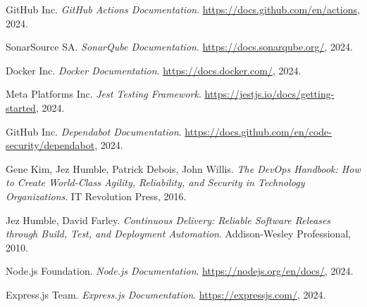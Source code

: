 


\begin{thebibliography}{9}

GitHub Inc.
\textit{GitHub Actions Documentation}.
\url{https://docs.github.com/en/actions}, 2024.

SonarSource SA.
\textit{SonarQube Documentation}.
\url{https://docs.sonarqube.org/}, 2024.

Docker Inc.
\textit{Docker Documentation}.
\url{https://docs.docker.com/}, 2024.

Meta Platforms Inc.
\textit{Jest Testing Framework}.
\url{https://jestjs.io/docs/getting-started}, 2024.

GitHub Inc.
\textit{Dependabot Documentation}.
\url{https://docs.github.com/en/code-security/dependabot}, 2024.

Gene Kim, Jez Humble, Patrick Debois, John Willis.
\textit{The DevOps Handbook: How to Create World-Class Agility, Reliability, and Security in Technology Organizations}.
IT Revolution Press, 2016.

Jez Humble, David Farley.
\textit{Continuous Delivery: Reliable Software Releases through Build, Test, and Deployment Automation}.
Addison-Wesley Professional, 2010.

Node.js Foundation.
\textit{Node.js Documentation}.
\url{https://nodejs.org/en/docs/}, 2024.

Express.js Team.
\textit{Express.js Documentation}.
\url{https://expressjs.com/}, 2024.

\end{thebibliography}